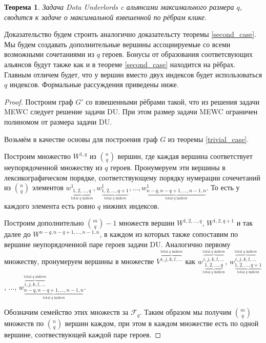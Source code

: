 \documentclass{article}
\newtheorem{theorem}{Теорема}
\begin{document}
\begin{theorem}
\label{general_case}
    Задача Dota Underlords c альянсами максимального размера  $q$, сводится к задаче о максимальной взвешенной по рёбрам клике.
\end{theorem}
	Доказательство будем строить аналогично доказательсту теоремы \ref{second_case}. 
Мы будем создавать дополнительные вершины ассоциируемые со всеми возможными сочетаниями из $q$ героев. Бонусы от образования соответсвующих альянсов будут также как и в теореме \ref{second_case} находится на рёбрах.
Главным отличем будет, что у вершин вместо двух индексов будет использоваться $q$ индексов. Формальные рассуждения приведены ниже.
\begin{proof}
    Построим граф $G'$ со взвешенными рёбрами такой, что из решения задачи MEWC следует решение задачи DU. При этом размер задачи MEWC ограничен полиномом от размера задачи DU.
    
    Возьмём в качестве основы для построения граф $G$ из теоремы \ref{trivial_case}.
    
    Построим множество $ W^{1, q }$ из $\binom{n}{q}$ вершин, где каждая вершина соответствует неупорядоченной множеству из $q$ героев. Пронумеруем эти вершины в лексикографическом порядке, соответствующему порядку нумерации сочечетаний из $\binom{n}{q}$ элементов $w^1_{ \underbrace{1,2,...,q}_\text{total $q$ indices}}, w^1_{\underbrace{1,2,...,q+1}_\text{total $q$ indices}},..., w^1_{ \underbrace{ n-q, n-q+1,..., n-1,n}_\text{total $q$ indices}} $. То есть у каждого элемента есть ровно $q$ нижних индексов.

    Построим дополнительно $\binom{m}{q}-1$ множеств вершин $W^{1,2,...,q}$, $W^{1,2,q+1}$ и так далее до $W^{n-q, n-q+1,..., n-1,n}$, в каждом из которых также сопоставим по вершине неупорядоченной паре героев задачи DU. Аналогично первому множеству, пронумеруем вершины в множестве $V^{\overbrace{i,j,k,l,...}^\text{total $q$ indices}}$ как $w_{\underbrace{1,2,...,q}_\text{total $q$ indices}}^{\overbrace{i,j,k,l,...}^\text{total $q$ indices}}$, $w_{\underbrace{1,2,...,q+1}_\text{total $q$ indices}}^{\overbrace{i,j,k,l,...}^\text{total $q$ indices}}$, ..., $w_{ \underbrace{ n-q, n-q+1,..., n-1,n}_\text{total $q$ indices}}^{\overbrace{i,j,k,l,...}^\text{total $q$ indices}}$.
    
    Обозначим семейство этих множеств за $\mathcal{F}_q$. Таким образом мы получим $\binom{m}{q}$ множеств по $\binom{n}{q}$ вершин каждом, при этом в каждом множестве есть по одной вершине, соотвествующей каждой паре героев.
    

\end{proof}
\end{document}
